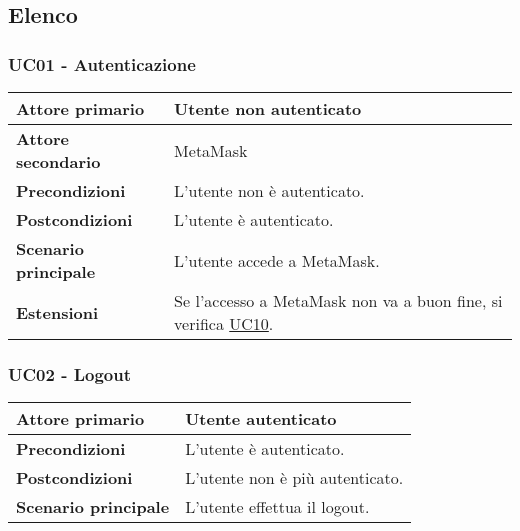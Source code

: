 \subsection{Elenco}

\subsubsection{UC01 - Autenticazione}
\label{UC01}
\begin{center}
\renewcommand{\arraystretch}{1.5}
\begin{tabular}{ | m{10em} | m{20em} | }
    \hline
    \textbf{Attore primario} & Utente non autenticato \\
    \hline
    \textbf{Attore secondario} & MetaMask \\
    \hline
    \textbf{Precondizioni} & L'utente non è autenticato. \\
    \hline
    \textbf{Postcondizioni} & L'utente è autenticato. \\
    \hline
    \textbf{Scenario principale} & L'utente accede a MetaMask. \\
    \hline
    \textbf{Estensioni} & Se l'accesso a MetaMask non va a buon fine, si verifica \hyperref[UC10]{UC10}. \\
    \hline
   \end{tabular}
\end{center}

\subsubsection{UC02 - Logout}
\label{UC02}
\begin{center}
\renewcommand{\arraystretch}{1.5}
\begin{tabular}{ | m{10em} | m{20em} | }
    \hline
    \textbf{Attore primario} & Utente autenticato \\
    \hline
    \textbf{Precondizioni} & L'utente è autenticato. \\
    \hline
    \textbf{Postcondizioni} & L'utente non è più autenticato. \\
    \hline
    \textbf{Scenario principale} & L'utente effettua il logout. \\
    \hline
   \end{tabular}
\end{center}

